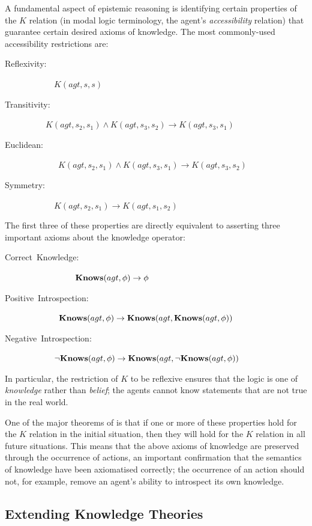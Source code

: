 A fundamental aspect of epistemic reasoning is identifying certain
properties of the $K$ relation (in modal logic terminology, the agent's
\emph{accessibility} relation) that guarantee certain desired axioms
of knowledge. The most commonly-used accessibility restrictions are: 
\begin{description}
\item [{{{{{{{{{{{{{{{{{{{Reflexivity:}}}}}}}}}}}}}}}}}}}] ~~~~~~$K(agt,s,s)$ 
\item [{{{{{{{{{{{{{{{{{{{Transitivity:}}}}}}}}}}}}}}}}}}}] ~~~~$K(agt,s_{2},s_{1})\wedge K(agt,s_{3},s_{2})\rightarrow K(agt,s_{3},s_{1})$ 
\item [{{{{{{{{{{{{{{{{{{{Euclidean:}}}}}}}}}}}}}}}}}}}] ~~~~~~~$K(agt,s_{2},s_{1})\wedge K(agt,s_{3},s_{1})\rightarrow K(agt,s_{3},s_{2})$ 
\item [{{{{{{{{{{{{{{{{{{{Symmetry:}}}}}}}}}}}}}}}}}}}] ~~~~~~$K(agt,s_{2},s_{1})\rightarrow K(agt,s_{1},s_{2})$ 
\end{description}
The first three of these properties are directly equivalent to asserting
three important axioms about the knowledge operator: 
\begin{description}
\item [{{{{{{{{{{{{{{{{{{{Correct~Knowledge:}}}}}}}}}}}}}}}}}}}] ~~~~~~~~~~~$\mathbf{Knows}(agt,\phi)\rightarrow\phi$ 
\item [{{{{{{{{{{{{{{{{{{{Positive~Introspection:}}}}}}}}}}}}}}}}}}}] ~~~~~~~$\mathbf{Knows}(agt,\phi)\rightarrow\mathbf{Knows}(agt,\mathbf{Knows}(agt,\phi))$ 
\item [{{{{{{{{{{{{{{{{{{{Negative~Introspection:}}}}}}}}}}}}}}}}}}}] ~~~~~~$\neg\mathbf{Knows}(agt,\phi)\rightarrow\mathbf{Knows}(agt,\neg\mathbf{Knows}(agt,\phi))$ 
\end{description}
In particular, the restriction of $K$ to be reflexive ensures that
the logic is one of \emph{knowledge} rather than \emph{belief}; the
agents cannot know statements that are not true in the real world.

One of the major theorems of \citep{scherl03sc_knowledge} is that
if one or more of these properties hold for the $K$ relation in the
initial situation, then they will hold for the $K$ relation in all
future situations. This means that the above axioms of knowledge are
preserved through the occurrence of actions, an important confirmation
that the semantics of knowledge have been axiomatised correctly; the
occurrence of an action should not, for example, remove an agent's
ability to introspect its own knowledge.


\subsection{Extending Knowledge Theories\label{sec:Knowledge:Extending}}


